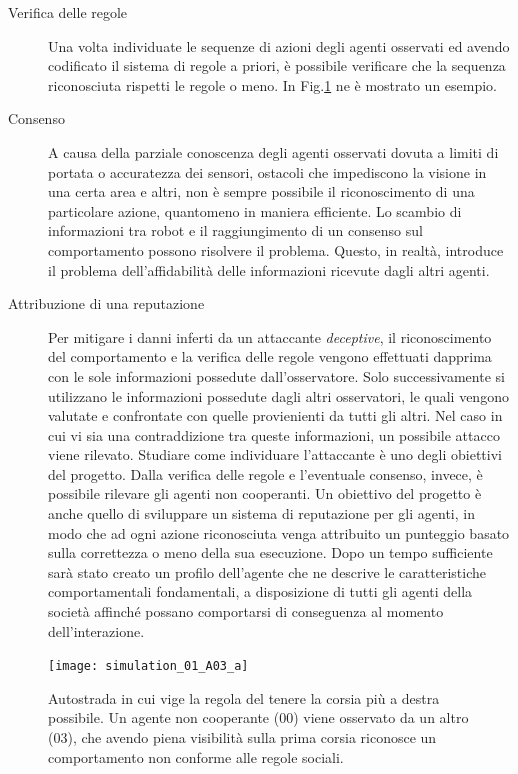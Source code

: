 \documentclass[paper=a4, fontsize=11pt]{scrartcl} %
\numberwithin{equation}{section} %
\numberwithin{table}{section} %
\begin{document}
\begin{description}
\item[Verifica delle regole] Una volta individuate le sequenze di azioni 
	degli agenti osservati ed avendo codificato il sistema di regole
	a priori, è possibile verificare che la sequenza riconosciuta rispetti le regole o meno. In Fig.\ref{img:noright} ne è mostrato un esempio. 
\item[Consenso] A causa della parziale conoscenza degli agenti osservati
dovuta a limiti di portata o accuratezza dei sensori, ostacoli che impediscono
la visione in una certa area e altri, non è sempre possibile il riconoscimento di una particolare azione, quantomeno in maniera efficiente.
Lo scambio di informazioni tra robot e il raggiungimento di un consenso 
sul comportamento possono risolvere il problema. Questo, in realtà, 
introduce il problema dell'affidabilità delle informazioni ricevute dagli 
altri agenti.  
\item[Attribuzione di una reputazione] Per mitigare i danni inferti 
da un attaccante \textit{deceptive},
il riconoscimento del comportamento e la verifica delle regole vengono
effettuati dapprima con le sole informazioni possedute dall'osservatore.
Solo successivamente si utilizzano le informazioni possedute dagli altri
osservatori, le quali vengono valutate e confrontate con quelle provienienti da tutti gli altri. Nel caso in cui vi sia una contraddizione tra queste informazioni, un possibile attacco viene rilevato. Studiare come individuare l'attaccante è uno degli obiettivi del progetto. Dalla verifica delle 
regole e l'eventuale consenso, invece, è possibile rilevare gli agenti non cooperanti. Un obiettivo del progetto è anche quello di sviluppare
un sistema di reputazione per gli agenti, in modo che ad ogni azione 
riconosciuta venga attribuito un punteggio basato sulla correttezza o meno
della sua esecuzione. Dopo un tempo sufficiente sarà stato creato 
un profilo dell'agente che ne descrive le caratteristiche comportamentali fondamentali, a disposizione di tutti gli agenti della società affinché possano comportarsi di conseguenza al momento dell'interazione.
\end{description}

\begin{figure}[ht]
\centering
\texttt{[image: simulation\_01\_A03\_a]}
\caption{Autostrada in cui vige la regola del tenere la corsia più a destra possibile. Un agente non cooperante (00) viene osservato da un altro (03), 
che avendo piena visibilità sulla prima corsia riconosce un comportamento
non conforme alle regole sociali.}
\label{img:noright}
\end{figure}
\end{document}
